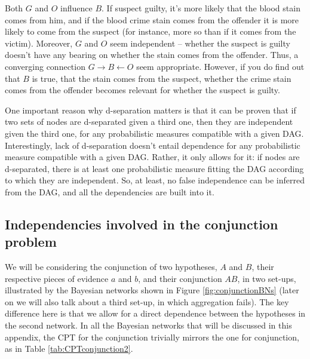 \documentclass[
  10pt,
  dvipsnames,enabledeprecatedfontcommands]{scrartcl}
\begin{document}
\noindent Both \(G\) and \(O\) influence \(B\). If suspect guilty, it's
more likely that the blood stain comes from him, and if the blood crime
stain comes from the offender it is more likely to come from the suspect
(for instance, more so than if it comes from the victim). Moreover,
\(G\) and \(O\) seem independent -- whether the suspect is guilty
doesn't have any bearing on whether the stain comes from the offender.
Thus, a converging connection \(G\rightarrow B \leftarrow O\) seem
appropriate. However, if you do find out that \(B\) is true, that the
stain comes from the suspect, whether the crime stain comes from the
offender becomes relevant for whether the suspect is guilty.

One important reason why d-separation matters is that it can be proven
that if two sets of nodes are d-separated given a third one, then they
are independent given the third one, for any probabilistic measures
compatible with a given DAG. Interestingly, lack of d-separation doesn't
entail dependence for any probabilistic measure compatible with a given
DAG. Rather, it only allows for it: if nodes are d-separated, there is
at least one probabilistic measure fitting the DAG according to which
they are independent. So, at least, no false independence can be
inferred from the DAG, and all the dependencies are built into it.

\hypertarget{independencies-involved-in-the-conjunction-problem}{%
\subsection*{Independencies involved in the conjunction
problem}\label{independencies-involved-in-the-conjunction-problem}}

We will be considering the conjunction of two hypotheses, \(A\) and
\(B\), their respective pieces of evidence \(a\) and \(b\), and their
conjunction \(AB\), in two set-ups, illustrated by the Bayesian networks
shown in Figure \ref{fig:conjunctionBNs} (later on we will also talk
about a third set-up, in which aggregation fails). The key difference
here is that we allow for a direct dependence between the hypotheses in
the second network. In all the Bayesian networks that will be discussed
in this appendix, the CPT for the conjunction trivially mirrors the one
for conjunction, as in Table \ref{tab:CPTconjunction2}.

\vspace{1mm}
\footnotesize
\end{document}
